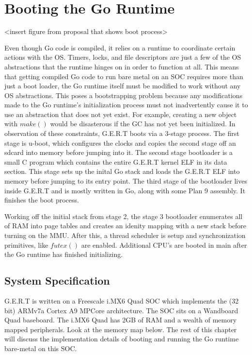 \chapter{Booting the Go Runtime}

<insert figure from proposal that shows boot process>

Even though Go code is compiled, it relies on a runtime to coordinate certain actions with the OS.
Timers, locks, and file descriptors are just a few of the OS abstractions that the runtime hinges on
in order to function at all. This means that getting compiled Go code to run bare metal on an SOC requires
more than just a boot loader, the Go runtime itself must be modified to work without any OS abstractions.
This poses a bootstrapping problem because any modifications made to the Go runtime's initialization
process must not inadvertently cause it to use an abstraction that does not yet exist. For example,
creating a new object with $make()$ would be disasterous if the GC has not yet been initialized.
In observation of these constraints, G.E.R.T boots via a 3-stage process. The first stage is u-boot, which
configures the clocks and copies the second stage off an sdcard into memory before jumping into it. The second
stage bootloader is a small C program which contains the entire G.E.R.T kernel ELF in its data section. This stage sets
up the inital Go stack and loads the G.E.R.T ELF into memory before jumping to its entry point. The third stage
of the bootloader lives inside G.E.R.T and is mostly written in Go, along with some Plan 9 assembly. It finishes the
boot process.



Working off the
initial stack from stage 2, the stage 3 bootloader enumerates all of RAM into page tables and creates an idenity mapping
with a new stack before turning on the MMU. After this, a thread scheduler is setup and synchronization primitives, like
$futex()$ are enabled. Additional CPU's are booted in main after the Go runtime has finished initializing.

\section{System Specification}
G.E.R.T is written on a Freescale i.MX6 Quad SOC which implements the (32 bit) ARMv7a Cortex A9 MPCore architecture.
The SOC sits on a Wandboard Quad baseboard. The i.MX6 Quad has 2GB of RAM and a wealth of memory mapped peripherals.
Look at the memory map below. The rest of this chapter will discuss the implementation details of booting and
running the Go runtime bare-metal on this SOC.

